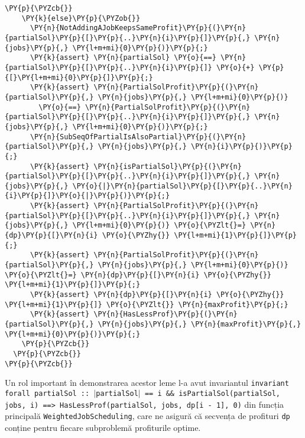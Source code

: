 \begin{itemize}
\begin{Verbatim}[commandchars=\\\{\},fontsize=\footnotesize]
    \PY{p}{\PYZcb{}}
    \PY{k}{else}\PY{p}{\PYZob{}}
      \PY{n}{NotAddingAJobKeepsSameProfit}\PY{p}{(}\PY{n}{partialSol}\PY{p}{[}\PY{p}{..}\PY{n}{i}\PY{p}{]}\PY{p}{,} \PY{n}{jobs}\PY{p}{,} \PY{l+m+mi}{0}\PY{p}{)}\PY{p}{;}
      \PY{k}{assert} \PY{n}{partialSol} \PY{o}{==} \PY{n}{partialSol}\PY{p}{[}\PY{p}{..}\PY{n}{i}\PY{p}{]} \PY{o}{+} \PY{p}{[}\PY{l+m+mi}{0}\PY{p}{]}\PY{p}{;}
      \PY{k}{assert} \PY{n}{PartialSolProfit}\PY{p}{(}\PY{n}{partialSol}\PY{p}{,} \PY{n}{jobs}\PY{p}{,} \PY{l+m+mi}{0}\PY{p}{)}
        \PY{o}{==} \PY{n}{PartialSolProfit}\PY{p}{(}\PY{n}{partialSol}\PY{p}{[}\PY{p}{..}\PY{n}{i}\PY{p}{]}\PY{p}{,} \PY{n}{jobs}\PY{p}{,} \PY{l+m+mi}{0}\PY{p}{)}\PY{p}{;}
      \PY{n}{SubSeqOfPartialIsAlsoPartial}\PY{p}{(}\PY{n}{partialSol}\PY{p}{,} \PY{n}{jobs}\PY{p}{,} \PY{n}{i}\PY{p}{)}\PY{p}{;}
      \PY{k}{assert} \PY{n}{isPartialSol}\PY{p}{(}\PY{n}{partialSol}\PY{p}{[}\PY{p}{..}\PY{n}{i}\PY{p}{]}\PY{p}{,} \PY{n}{jobs}\PY{p}{,} \PY{o}{|}\PY{n}{partialSol}\PY{p}{[}\PY{p}{..}\PY{n}{i}\PY{p}{]}\PY{o}{|}\PY{p}{)}\PY{p}{;}
      \PY{k}{assert} \PY{n}{PartialSolProfit}\PY{p}{(}\PY{n}{partialSol}\PY{p}{[}\PY{p}{..}\PY{n}{i}\PY{p}{]}\PY{p}{,} \PY{n}{jobs}\PY{p}{,} \PY{l+m+mi}{0}\PY{p}{)} \PY{o}{\PYZlt{}=} \PY{n}{dp}\PY{p}{[}\PY{n}{i} \PY{o}{\PYZhy{}} \PY{l+m+mi}{1}\PY{p}{]}\PY{p}{;}
      \PY{k}{assert} \PY{n}{PartialSolProfit}\PY{p}{(}\PY{n}{partialSol}\PY{p}{,} \PY{n}{jobs}\PY{p}{,} \PY{l+m+mi}{0}\PY{p}{)}  \PY{o}{\PYZlt{}=} \PY{n}{dp}\PY{p}{[}\PY{n}{i} \PY{o}{\PYZhy{}} \PY{l+m+mi}{1}\PY{p}{]}\PY{p}{;}
      \PY{k}{assert} \PY{n}{dp}\PY{p}{[}\PY{n}{i} \PY{o}{\PYZhy{}} \PY{l+m+mi}{1}\PY{p}{]} \PY{o}{\PYZlt{}} \PY{n}{maxProfit}\PY{p}{;}
      \PY{k}{assert} \PY{n}{HasLessProf}\PY{p}{(}\PY{n}{partialSol}\PY{p}{,} \PY{n}{jobs}\PY{p}{,} \PY{n}{maxProfit}\PY{p}{,} \PY{l+m+mi}{0}\PY{p}{)}\PY{p}{;}
    \PY{p}{\PYZcb{}}
  \PY{p}{\PYZcb{}}
\PY{p}{\PYZcb{}}
\end{Verbatim}
Un rol important în demonstrarea acestor leme l-a avut invariantul \texttt{invariant forall partialSol :: $|$partialSol$|$ == i  \&\& isPartialSol(partialSol, jobs, i) ==> HasLessProf(partialSol, jobs, dp[i - 1], 0)} din funcția principală \texttt{WeightedJobScheduling}, care ne asigură că secvența de profituri \texttt{dp} conține pentru fiecare subproblemă profiturile optime. 


\end{itemize}
